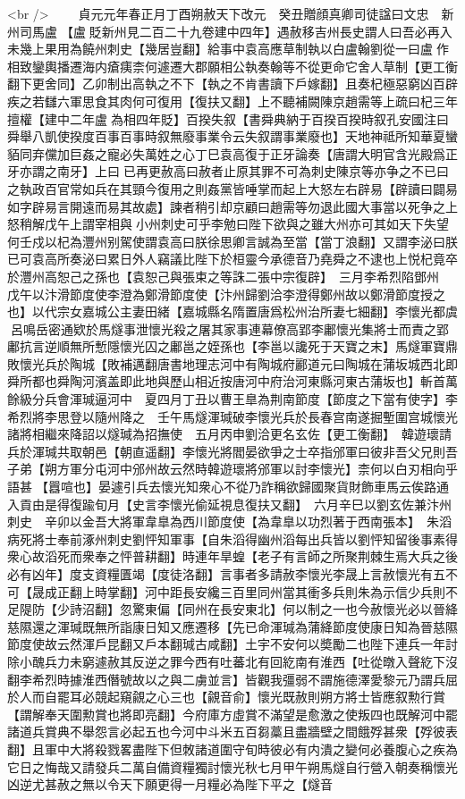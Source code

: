 <br />
　　貞元元年春正月丁酉朔赦天下改元　癸丑贈顔真卿司徒諡曰文忠　新州司馬盧【盧貶新州見二百二十九卷建中四年】遇赦移吉州長史謂人曰吾必再入未幾上果用為饒州刺史【幾居豈翻】給事中袁高應草制執以白盧翰劉從一曰盧作相致鑾輿播遷海内瘡痍柰何遽遷大郡願相公執奏翰等不從更命它舍人草制【更工衡翻下更舍同】乙卯制出高執之不下【執之不肯書讀下戶嫁翻】且奏杞極惡窮凶百辟疾之若讎六軍思食其肉何可復用【復扶又翻】上不聽補闕陳京趙需等上疏曰杞三年擅權【建中二年盧為相四年貶】百揆失叙【書舜典納于百揆百揆時叙孔安國注曰舜舉八凱使揆度百事百事時叙無廢事業令云失叙謂事業廢也】天地神祗所知華夏蠻貊同弃儻加巨姦之寵必失萬姓之心丁巳袁高復于正牙論奏【唐謂大明官含光殿爲正牙亦謂之南牙】上曰已再更赦高曰赦者止原其罪不可為刺史陳京等亦争之不已曰之執政百官常如兵在其頸今復用之則姦黨皆唾掌而起上大怒左右辟易【辟讀曰闢易如字辟易言開遠而易其故處】諫者稍引却京顧曰趙需等勿退此國大事當以死争之上怒稍解戊午上謂宰相與小州刺史可乎李勉曰陛下欲與之雖大州亦可其如天下失望何壬戍以杞為灃州别駕使謂袁高曰朕徐思卿言誠為至當【當丁浪翻】又謂李泌曰朕已可袁高所奏泌曰累日外人竊議比陛下於桓靈今承德音乃堯舜之不逮也上悦杞竟卒於灃州高恕己之孫也【袁恕己與張束之等誅二張中宗復辟】　三月李希烈陷鄧州　戊午以汴滑節度使李澄為鄭滑節度使【汴州歸劉洽李澄得鄭州故以鄭滑節度授之也】以代宗女嘉城公主妻田緒【嘉城縣名隋置唐爲松州治所妻七細翻】李懷光都虞呂鳴岳密通欵於馬燧事泄懷光殺之屠其家事連幕僚高郢李鄘懷光集將士而責之郢鄘抗言逆順無所慙隱懷光囚之鄘邕之姪孫也【李邕以讒死于天寶之末】馬燧軍寶鼎敗懷光兵於陶城【敗補邁翻唐書地理志河中有陶城府酈道元曰陶城在蒲坂城西北即舜所都也舜陶河濱盖即此地與歷山相近按唐河中府治河東縣河東古蒲坂也】斬首萬餘級分兵會渾瑊逼河中　夏四月丁丑以曹王臯為荆南節度【節度之下當有使字】李希烈將李思登以隨州降之　壬午馬燧渾瑊破李懷光兵於長春宫南遂掘塹圍宫城懷光諸將相繼來降詔以燧瑊為招撫使　五月丙申劉洽更名玄佐【更工衡翻】　韓遊瓌請兵於渾瑊共取朝邑【朝直遥翻】李懷光將閻晏欲爭之士卒指邠軍曰彼非吾父兄則吾子弟【朔方軍分屯河中邠州故云然時韓遊瓌將邠軍以討李懷光】柰何以白刃相向乎語甚【囂喧也】晏遽引兵去懷光知衆心不從乃詐稱欲歸國聚貨財飾車馬云俟路通入貢由是得復踰旬月【史言李懷光偷延視息復扶又翻】　六月辛巳以劉玄佐兼汴州刺史　辛卯以金吾大將軍韋臯為西川節度使【為韋臯以功烈著于西南張本】　朱滔病死將士奉前涿州刺史劉怦知軍事【自朱滔得幽州滔每出兵皆以劉怦知留後事素得衆心故滔死而衆奉之怦普耕翻】時連年旱蝗【老子有言師之所聚荆棘生焉大兵之後必有凶年】度支資糧匱竭【度徒洛翻】言事者多請赦李懷光李晟上言赦懷光有五不可【晟成正翻上時掌翻】河中距長安纔三百里同州當其衝多兵則朱為示信少兵則不足隄防【少詩沼翻】忽驚東偏【同州在長安東北】何以制之一也今赦懷光必以晉絳慈隰還之渾瑊既無所詣康日知又應遷移【先已命渾瑊為蒲絳節度使康日知為晉慈隰節度使故云然渾戶昆翻又戶本翻瑊古咸翻】土宇不安何以奬勵二也陛下連兵一年討除小醜兵力未窮遽赦其反逆之罪今西有吐蕃北有回紇南有淮西【吐從暾入聲紇下沒翻李希烈時據淮西僭號故以之與二虜並言】皆觀我彊弱不謂施德澤愛黎元乃謂兵屈於人而自罷耳必競起窺覦之心三也【覦音俞】懷光既赦則朔方將士皆應叙勲行賞【謂解奉天圍勲賞也將即亮翻】今府庫方虛賞不滿望是愈激之使叛四也既解河中罷諸道兵賞典不舉怨言必起五也今河中斗米五百芻藁且盡牆壁之間餓殍甚衆【殍彼表翻】且軍中大將殺戮畧盡陛下但敇諸道圍守旬時彼必有内潰之變何必養腹心之疾為它日之悔哉又請發兵二萬自備資糧獨討懷光秋七月甲午朔馬燧自行營入朝奏稱懷光凶逆尤甚赦之無以令天下願更得一月糧必為陛下平之【燧音